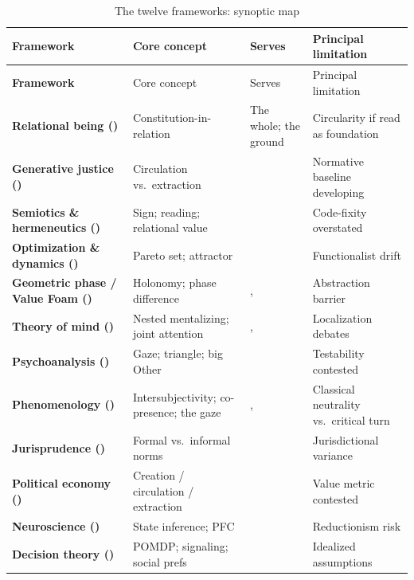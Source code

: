 \goldrule
\begin{landscape}
\footnotesize
\begin{longtable}{>{\bfseries\color{rosedeep}}p{2.8cm} Y Y Y}
\caption{The twelve frameworks: synoptic map}\label{p07:tab:frameworks}\\
\toprule
{}
Framework & Core concept & Serves & Principal limitation \\
\midrule
\endfirsthead
{}
Framework & Core concept & Serves & Principal limitation \\
\midrule
\endhead
Relational being () & Constitution-in-relation & The whole; the ground & Circularity if read as foundation \\
Generative justice () & Circulation vs.\ extraction &  & Normative baseline developing \\
Semiotics \& hermeneutics () & Sign; reading; relational value &  & Code-fixity overstated \\
Optimization \& dynamics () & Pareto set; attractor &  & Functionalist drift \\
Geometric phase / Value Foam () & Holonomy; phase difference & ,  & Abstraction barrier \\
Theory of mind () & Nested mentalizing; joint attention & ,  & Localization debates \\
Psychoanalysis () & Gaze; triangle; big Other &  & Testability contested \\
Phenomenology () & Intersubjectivity; co-presence; the gaze & ,  & Classical neutrality vs.\ critical turn \\
Jurisprudence () & Formal vs.\ informal norms &  & Jurisdictional variance \\
Political economy () & Creation / circulation / extraction &  & Value metric contested \\
Neuroscience () & State inference; PFC &  & Reductionism risk \\
Decision theory () & POMDP; signaling; social prefs &  & Idealized assumptions \\
\bottomrule
\end{longtable}
\end{landscape}

